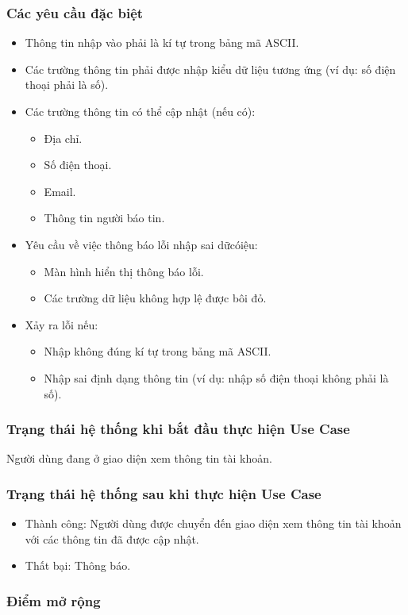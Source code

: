 \subsubsection{Các yêu cầu đặc biệt}
\begin{itemize}
  \item Thông tin nhập vào phải là kí tự trong bảng mã ASCII.
  \item Các trường thông tin phải được nhập kiểu dữ liệu tương ứng (ví dụ: số điện thoại phải là số).
  \item Các trường thông tin có thể cập nhật (nếu có):
    \begin{itemize}
      \item Địa chỉ.
      \item Số điện thoại.
      \item Email.
      \item Thông tin người báo tin.
    \end{itemize}
  \item Yêu cầu về việc thông báo lỗi nhập sai dữcóiệu:
    \begin{itemize}
      \item Màn hình hiển thị thông báo lỗi.
      \item Các trường dữ liệu không hợp lệ được bôi đỏ.
    \end{itemize}
  \item Xảy ra lỗi nếu:
    \begin{itemize}
      \item Nhập không đúng kí tự trong bảng mã ASCII.
      \item Nhập sai định dạng thông tin (ví dụ: nhập số điện thoại không phải là số).
    \end{itemize}
\end{itemize}

\subsubsection{Trạng thái hệ thống khi bắt đầu thực hiện Use Case}
Người dùng đang ở giao diện xem thông tin tài khoản.

\subsubsection{Trạng thái hệ thống sau khi thực hiện Use Case}
\begin{itemize}
  \item Thành công: Người dùng được chuyển đến giao diện xem thông tin tài khoản với các thông tin đã được cập nhật.
  \item Thất bại: Thông báo.
\end{itemize}

\subsubsection{Điểm mở rộng}